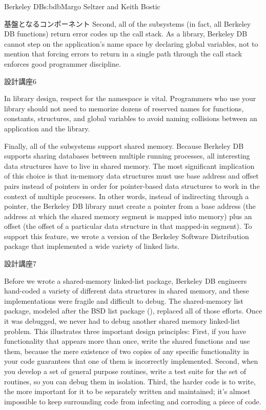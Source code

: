 \begin{aosachapter}{Berkeley DB}{s:bdb}{Margo Seltzer and Keith Bostic}
\begin{aosasect1}{基盤となるコンポーネント}
Second, all of the subsystems (in fact, all Berkeley DB functions)
return error codes up the call stack.  As a library, Berkeley DB
cannot step on the application's name space by declaring global
variables, not to mention that forcing errors to return in a single
path through the call stack enforces good programmer discipline. 

\begin{aosabox}{設計講座6}

In library design, respect for the namespace is vital. Programmers who
use your library should not need to memorize dozens of reserved names
for functions, constants, structures, and global variables to avoid
naming collisions between an application and the library.

\end{aosabox}

Finally, all of the subsystems support shared memory. Because Berkeley
DB supports sharing databases between multiple running processes, all
interesting data structures have to live in shared memory. The most
significant implication of this choice is that in-memory data
structures must use base address and offset pairs instead of pointers
in order for pointer-based data structures to work in the context of
multiple processes. In other words, instead of indirecting through a
pointer, the Berkeley DB library must create a pointer from a base
address (the address at which the shared memory segment is mapped into
memory) plus an offset (the offset of a particular data structure in
that mapped-in segment). To support this feature, we
wrote a version of the Berkeley Software Distribution  package
that implemented a wide variety of linked lists. 

\begin{aosabox}{設計講座7}

Before we wrote a shared-memory linked-list package, Berkeley DB
engineers hand-coded a variety of different data structures in shared
memory, and these implementations were fragile and difficult to
debug. The shared-memory list package, modeled after the BSD list
package (), replaced all of those efforts.  Once it was
debugged, we never had to debug another shared memory linked-list
problem.  This illustrates three important design principles: First,
if you have functionality that appears more than once, write the
shared functions and use them, because the mere existence of two
copies of any specific functionality in your code guarantees that one
of them is incorrectly implemented.  Second, when you develop a set of
general purpose routines, write a test suite for the set of routines,
so you can debug them in isolation.  Third, the harder code is to
write, the more important for it to be separately written and
maintained; it's almost impossible to keep surrounding code from
infecting and corroding a piece of code.


\end{aosabox}
\end{aosasect1}
\end{aosachapter}
